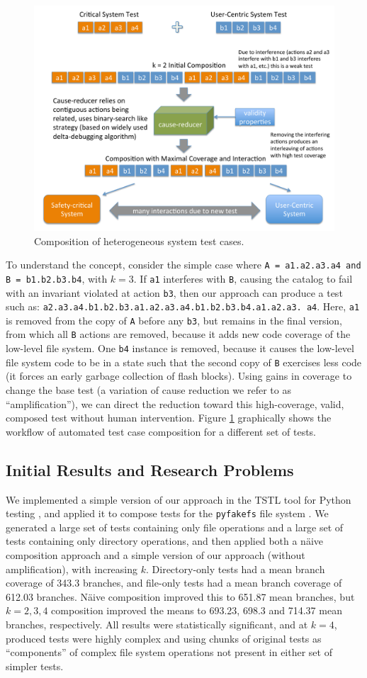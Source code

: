\begin{figure}
\centering
\includegraphics[width=0.6\columnwidth]{testcomp}
\caption{Composition of heterogeneous system test cases.}
\label{fig:compose}
\end{figure}


To understand the concept, consider the simple case where {\tt A =
  a1.a2.a3.a4 and B = b1.b2.b3.b4}, with $k = 3$.  If {\tt a1}
interferes with {\tt B}, causing the catalog to fail with an invariant
violated at action {\tt b3}, then our approach can produce a test such
as: {\tt a2.a3.a4.b1.b2.b3.a1.a2.a3.a4.b1.b2.b3.b4.a1.a2.a3. a4}. Here,
{\tt a1} is removed from the copy of {\tt A} before any {\tt b3}, but
remains in the final version, from which all {\tt B} actions are
removed, because it adds new code coverage of the low-level file
system.  One {\tt b4} instance is removed, because it causes the
low-level file system code to be in a state such that the second copy
of {\tt B} exercises less code (it forces an early garbage collection
of flash blocks).  Using gains in coverage to change the base test (a
variation of cause reduction we refer to as ``amplification''), we can direct
the reduction toward this high-coverage, valid, composed test without
human intervention.  Figure \ref{fig:compose} graphically shows the workflow of
automated test case composition for a different set of tests.

\subsection{Initial Results and Research Problems}

We implemented a simple version of our approach in the TSTL tool for
Python testing \cite{tstlsttt,NFM15}, and applied
it to compose tests for the {\tt pyfakefs} file system \cite{pyfakefs}.  We generated a
large set of tests containing only file operations and a large set of
tests containing only directory operations, and then applied both a
n\"aive composition approach and a simple version of our approach
(without amplification), with increasing $k$.  Directory-only tests
had a mean branch coverage of 343.3 branches, and file-only tests had
a mean branch coverage of 612.03 branches.  N\"aive composition
improved this to 651.87 mean branches, but $k=2, 3, 4$ composition improved
the means to 693.23, 698.3 and 714.37 mean branches, respectively.
All results were statistically significant, and at $k=4$, produced
tests were highly complex and using chunks of original tests as
``components'' of complex file system operations not present in either
set of simpler tests.

